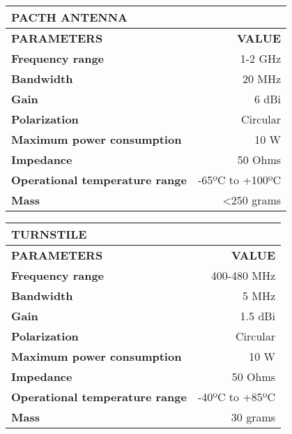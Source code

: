 \begin{longtable}{| l | r |}

\hline
\rowcolor[gray]{0.60}	\textbf{PACTH ANTENNA} \\
\hline

\hline
\rowcolor[gray]{0.75}	\textbf{PARAMETERS} &  \textbf{VALUE}   \\
\hline

\cellcolor[gray]{0.85} \textbf{Frequency range} & 1-2 GHz  \\
\cellcolor[gray]{0.85} \textbf{Bandwidth} & 20 MHz \\
\cellcolor[gray]{0.85} \textbf{Gain} & 6 dBi  \\
\cellcolor[gray]{0.85} \textbf{Polarization} & Circular \\
\cellcolor[gray]{0.85} \textbf{Maximum power consumption} & 10 W \\
\cellcolor[gray]{0.85} \textbf{Impedance} & 50 Ohms \\
\cellcolor[gray]{0.85} \textbf{Operational temperature range} & -65ºC to +100ºC \\
\cellcolor[gray]{0.85} \textbf{Mass} & <250 grams \\
\hline

\end{longtable}

\begin{longtable}{| l | r |}

\hline
\rowcolor[gray]{0.60}	\textbf{TURNSTILE} \\
\hline

\hline
\rowcolor[gray]{0.75}	\textbf{PARAMETERS} &  \textbf{VALUE}   \\
\hline

\cellcolor[gray]{0.85} \textbf{Frequency range} & 400-480 MHz  \\
\cellcolor[gray]{0.85} \textbf{Bandwidth} & 5 MHz \\
\cellcolor[gray]{0.85} \textbf{Gain} & 1.5 dBi \\
\cellcolor[gray]{0.85} \textbf{Polarization} & Circular \\
\cellcolor[gray]{0.85} \textbf{Maximum power consumption} & 10 W \\
\cellcolor[gray]{0.85} \textbf{Impedance} & 50 Ohms \\
\cellcolor[gray]{0.85} \textbf{Operational temperature range} & -40ºC to +85ºC \\
\cellcolor[gray]{0.85} \textbf{Mass} & 30 grams \\
\hline

\end{longtable}


